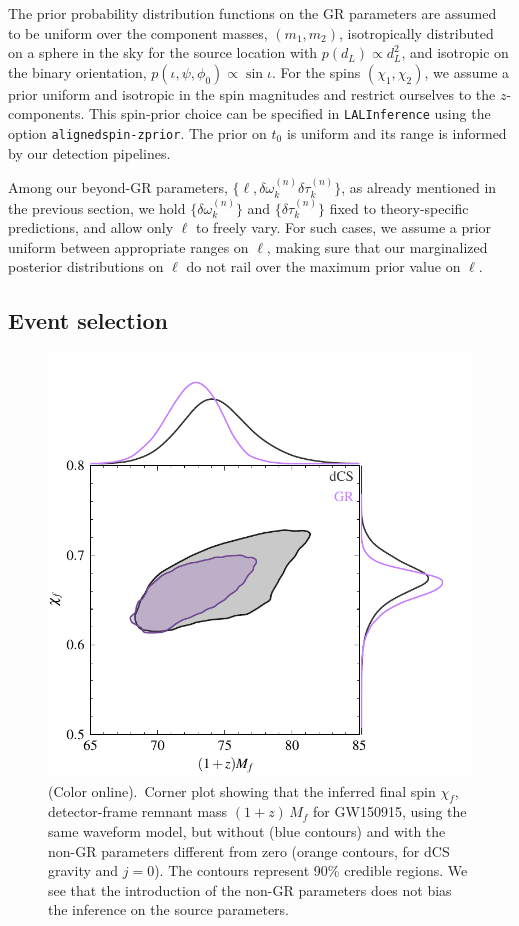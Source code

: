 The prior probability distribution functions on the GR parameters are assumed to be uniform over the component masses, $(m_1, m_2)$, isotropically distributed on a sphere in the sky for the source location with $p(d_L) \propto d_L^2$, and isotropic on the binary orientation, $p(\iota, \psi, \phi_0) \propto \sin\iota$. For the spins $(\chi_1, \chi_2)$, we assume a prior uniform and isotropic in the spin magnitudes and restrict ourselves to the $z$-components.
This spin-prior choice can be specified in \texttt{LALInference} using the option \texttt{alignedspin-zprior}.
%
The prior on $t_0$ is uniform and its range is informed by our detection pipelines.

Among our beyond-GR parameters, $\{\ell, \delta \omega_k^{(n)}\delta \tau_k^{(n)}\}$,
as already mentioned in the previous section, we hold $\{\delta \omega_k^{(n)}\}$
and $\{\delta \tau_k^{(n)}\}$ fixed to theory-specific predictions, and allow only $\ell$
to freely vary.
%
For such cases, we assume a prior uniform between appropriate ranges on $\ell$,
making sure that our marginalized posterior distributions on $\ell$ do not rail
over the maximum prior value on $\ell$.


\subsection{Event selection}

\begin{figure}[t]
\includegraphics[width=0.9\columnwidth]{figs/tmp_GW150914_intrinsic_params_remnant.pdf}
\caption{(Color online).~Corner plot showing that the inferred final spin $\chi_f$,
detector-frame remnant mass $(1 + z) \, M_f$ for GW150915, using the same waveform model,
but without (blue contours) and with the non-GR parameters different from zero (orange contours, for
dCS gravity and $j=0$). The contours represent 90\% credible regions.
%
We see that the introduction of the non-GR parameters does not bias the
inference on the source parameters.
}
\label{fig:corner_plot}
\end{figure}

